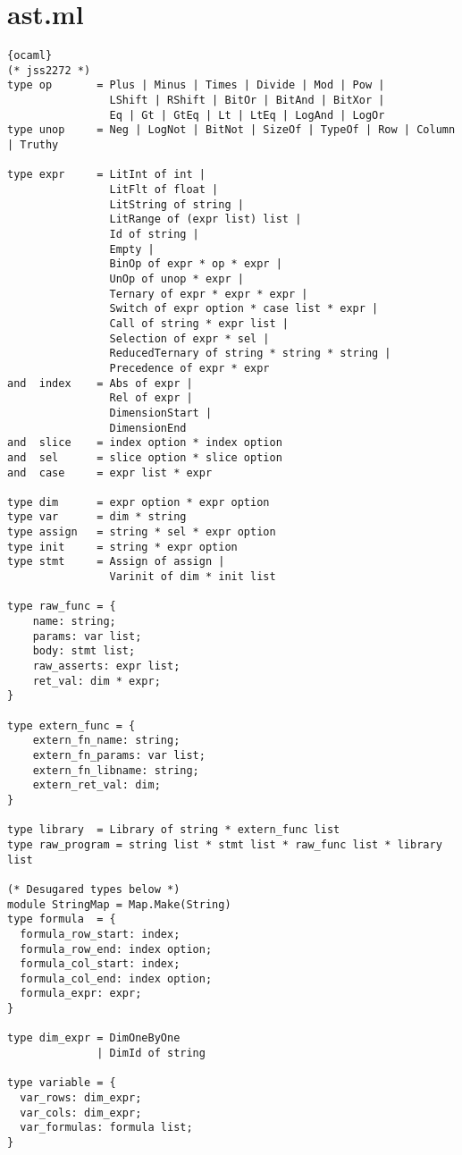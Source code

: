 \section{ast.ml}
\begin{lstlisting}{ocaml}
(* jss2272 *)
type op       = Plus | Minus | Times | Divide | Mod | Pow |
                LShift | RShift | BitOr | BitAnd | BitXor |
                Eq | Gt | GtEq | Lt | LtEq | LogAnd | LogOr
type unop     = Neg | LogNot | BitNot | SizeOf | TypeOf | Row | Column | Truthy

type expr     = LitInt of int |
                LitFlt of float |
                LitString of string |
                LitRange of (expr list) list |
                Id of string |
                Empty |
                BinOp of expr * op * expr |
                UnOp of unop * expr |
                Ternary of expr * expr * expr |
                Switch of expr option * case list * expr |
                Call of string * expr list |
                Selection of expr * sel |
                ReducedTernary of string * string * string |
                Precedence of expr * expr
and  index    = Abs of expr |
                Rel of expr |
                DimensionStart |
                DimensionEnd
and  slice    = index option * index option
and  sel      = slice option * slice option
and  case     = expr list * expr

type dim      = expr option * expr option
type var      = dim * string
type assign   = string * sel * expr option
type init     = string * expr option
type stmt     = Assign of assign |
                Varinit of dim * init list

type raw_func = {
    name: string;
    params: var list;
    body: stmt list;
    raw_asserts: expr list;
    ret_val: dim * expr;
}

type extern_func = {
    extern_fn_name: string;
    extern_fn_params: var list;
    extern_fn_libname: string;
    extern_ret_val: dim;
}

type library  = Library of string * extern_func list
type raw_program = string list * stmt list * raw_func list * library list

(* Desugared types below *)
module StringMap = Map.Make(String)
type formula  = {
  formula_row_start: index;
  formula_row_end: index option;
  formula_col_start: index;
  formula_col_end: index option;
  formula_expr: expr;
}

type dim_expr = DimOneByOne
              | DimId of string

type variable = {
  var_rows: dim_expr;
  var_cols: dim_expr;
  var_formulas: formula list;
}


\end{lstlisting}
